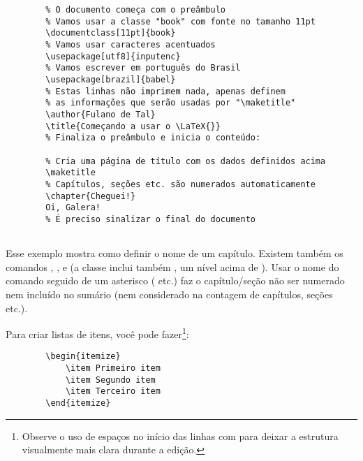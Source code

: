 \begin{verbatim}
        % O documento começa com o preâmbulo
        % Vamos usar a classe "book" com fonte no tamanho 11pt
        \documentclass[11pt]{book}
        % Vamos usar caracteres acentuados
        \usepackage[utf8]{inputenc}
        % Vamos escrever em português do Brasil
        \usepackage[brazil]{babel}
        % Estas linhas não imprimem nada, apenas definem
        % as informações que serão usadas por "\maketitle"
        \author{Fulano de Tal}
        \title{Começando a usar o \LaTeX{}}
        % Finaliza o preâmbulo e inicia o conteúdo:
        
        % Cria uma página de título com os dados definidos acima
        \maketitle
        % Capítulos, seções etc. são numerados automaticamente
        \chapter{Cheguei!}
        Oi, Galera!
        % É preciso sinalizar o final do documento
        
\end{verbatim}

Esse exemplo mostra como definir o nome de um capítulo. Existem também os
comandos , ,  e
 (a classe  inclui também , um nível
acima de ). Usar o nome do comando seguido de um asterisco
( etc.) faz o capítulo/seção não ser numerado nem incluído
no sumário (nem considerado na contagem de capítulos, seções etc.).

Para criar listas de itens, você pode fazer\footnote{Observe o uso de
espaços no início das linhas com  para deixar a
estrutura visualmente mais clara durante a edição.}:

\begin{verbatim}
        \begin{itemize}
            \item Primeiro item
            \item Segundo item
            \item Terceiro item
        \end{itemize}
\end{verbatim}

